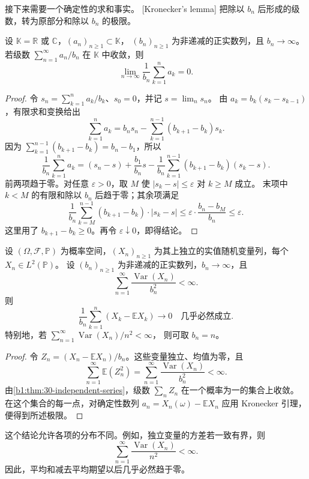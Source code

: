 接下来需要一个确定性的求和事实。
[Kronecker's lemma]
把除以 \(b_n\) 后形成的级数，转为原部分和除以 \(b_n\) 的极限。

\begin{lemma}[Kronecker]
\label{b1:lem:30-kronecker}
设 \(\mathbb K=\mathbb R\) 或 \(\mathbb C\)，\((a_n)_{n\geq1}\subset\mathbb K\)，
\((b_n)_{n\geq1}\) 为非递减的正实数列，且 \(b_n\to\infty\)。
若级数 \(\sum_{n=1}^\infty a_n/b_n\) 在 \(\mathbb K\) 中收敛，则
\[
 \lim_{n\to\infty}\frac1{b_n}\sum_{k=1}^na_k=0.
\]
\end{lemma}
\begin{proof}
令 \(s_n=\sum_{k=1}^na_k/b_k\)、\(s_0=0\)，并记 \(s=\lim_ns_n\)。
由 \(a_k=b_k(s_k-s_{k-1})\)，有限求和变换给出
\[
 \sum_{k=1}^na_k
 =b_ns_n-\sum_{k=1}^{n-1}(b_{k+1}-b_k)s_k.
\]
因为 \(\sum_{k=1}^{n-1}(b_{k+1}-b_k)=b_n-b_1\)，所以
\[
 \frac1{b_n}\sum_{k=1}^na_k
 =(s_n-s)+\frac{b_1}{b_n}s
   -\frac1{b_n}\sum_{k=1}^{n-1}(b_{k+1}-b_k)(s_k-s).
\]
前两项趋于零。对任意 \(\varepsilon>0\)，取 \(M\) 使
\(|s_k-s|\leq\varepsilon\) 对 \(k\geq M\) 成立。
末项中 \(k<M\) 的有限和除以 \(b_n\) 后趋于零；其余项满足
\[
 \frac1{b_n}\sum_{k=M}^{n-1}(b_{k+1}-b_k)\cdot|s_k-s|
 \leq\varepsilon\cdot\frac{b_n-b_M}{b_n}\leq\varepsilon.
\]
这里用了 \(b_{k+1}-b_k\geq0\)。再令 \(\varepsilon\downarrow0\)，即得结论。
\end{proof}

\begin{corollary}[方差条件下的归一化强大数定律]
\label{b1:cor:30-variance-strong-law}
设 \((\Omega,\mathcal F,\mathbb P)\) 为概率空间，\((X_n)_{n\geq1}\)
为其上独立的实值随机变量列，每个 \(X_n\in L^2(\mathbb P)\)。
设 \((b_n)_{n\geq1}\) 为非递减的正实数列，\(b_n\to\infty\)，且
\[
 \sum_{n=1}^\infty\frac{\operatorname{Var}(X_n)}{b_n^2}<\infty.
\]
则
\[
 \frac1{b_n}\sum_{k=1}^n(X_k-\mathbb E X_k)
 \longrightarrow0\quad\text{几乎必然成立}.
\]
特别地，若 \(\sum_{n=1}^\infty\operatorname{Var}(X_n)/n^2<\infty\)，
则可取 \(b_n=n\)。
\end{corollary}
\begin{proof}
令 \(Z_n=(X_n-\mathbb E X_n)/b_n\)。这些变量独立、均值为零，且
\[
 \sum_{n=1}^\infty\mathbb E(Z_n^2)
 =\sum_{n=1}^\infty\frac{\operatorname{Var}(X_n)}{b_n^2}<\infty.
\]
由\cref{b1:thm:30-independent-series}，级数 \(\sum_nZ_n\) 在一个概率为一的集合上收敛。
在这个集合的每一点，对确定性数列 \(a_n=X_n(\omega)-\mathbb E X_n\)
应用 Kronecker 引理，便得到所述极限。
\end{proof}

这个结论允许各项的分布不同。例如，独立变量的方差若一致有界，则
\[
 \sum_{n=1}^{\infty}\frac{\operatorname{Var}(X_n)}{n^2}<\infty.
\]
因此，平均和减去平均期望以后几乎必然趋于零。

